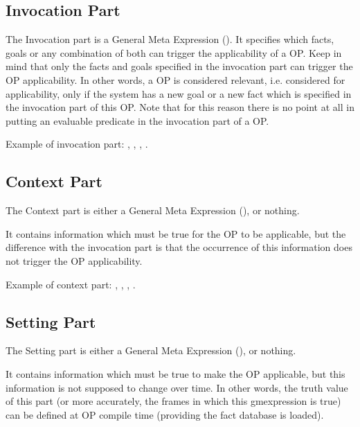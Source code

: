 \subsection{Invocation Part}

The Invocation part is a General Meta Expression (). It specifies which facts, goals or any combination of both can
trigger the applicability of a OP. Keep in mind that only the facts
and goals specified in the invocation part can trigger the OP applicability. In
other words, a OP is considered relevant, i.e.  considered for applicability,
only if the system has a new goal or a new fact which is specified in
the invocation part of this OP. Note that for this reason there is no point at
all in putting an evaluable predicate in the invocation part of a OP.

Example of invocation part: \*
, \*
, \*
, \*
.

\subsection{Context Part}

The Context part is either a General Meta Expression (), or nothing.

It contains information which must be true for the OP to be applicable, but the
difference with the invocation part is that the occurrence of this information
does not trigger the OP applicability.

Example of context part: \*
, \*
, \*
, \*
.

\subsection{Setting Part}

The Setting part is either a General Meta Expression (), or nothing.

It contains information which must be true to make the OP applicable, but
this information is not supposed to change over time. In other words, the
truth value of this part (or more accurately, the frames in which this
gmexpression is true) can be defined at OP compile time (providing the
fact database is loaded).


